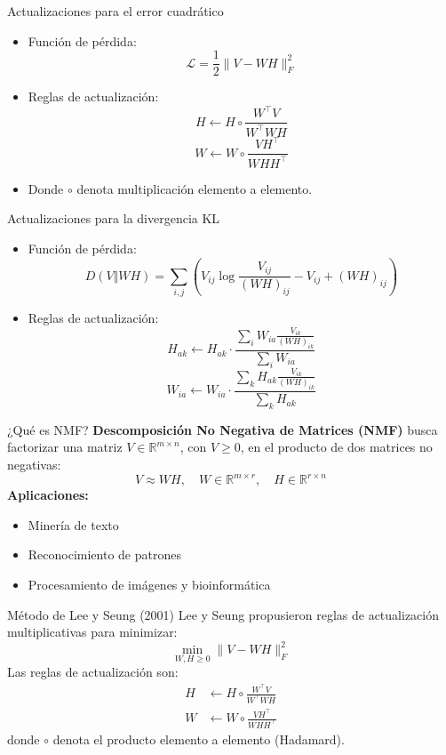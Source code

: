 \documentclass{beamer}
\begin{document}
\begin{frame}{Actualizaciones para el error cuadrático}
\begin{itemize}
    \item Función de pérdida:
    \[
    \mathcal{L} = \frac{1}{2} \| V - WH \|_F^2
    \]
    \item Reglas de actualización:
    \[
    H \leftarrow H \circ \frac{W^\top V}{W^\top W H}
    \]
    \[
    W \leftarrow W \circ \frac{V H^\top}{W H H^\top}
    \]
    \item Donde $ \circ $ denota multiplicación elemento a elemento.
\end{itemize}
\end{frame}

\begin{frame}{Actualizaciones para la divergencia KL}
\begin{itemize}
    \item Función de pérdida:
    \[
    D(V \Vert WH) = \sum_{i,j} \left( V_{ij} \log \frac{V_{ij}}{(WH)_{ij}} - V_{ij} + (WH)_{ij} \right)
    \]
    \item Reglas de actualización:
    \[
    H_{ak} \leftarrow H_{ak} \cdot \frac{\sum_i W_{ia} \frac{V_{ik}}{(WH)_{ik}}}{\sum_i W_{ia}}
    \]
    \[
    W_{ia} \leftarrow W_{ia} \cdot \frac{\sum_k H_{ak} \frac{V_{ik}}{(WH)_{ik}}}{\sum_k H_{ak}}
    \]
\end{itemize}
\end{frame}


\begin{frame}{¿Qué es NMF?}
    \textbf{Descomposición No Negativa de Matrices (NMF)} busca factorizar una matriz $ V \in \mathbb{R}^{m \times n} $, con $ V \geq 0 $, en el producto de dos matrices no negativas:
    \[
        V \approx WH, \quad W \in \mathbb{R}^{m \times r}, \quad H \in \mathbb{R}^{r \times n}
    \]
    \pause
    \textbf{Aplicaciones:}
    \begin{itemize}
        \item Minería de texto
        \item Reconocimiento de patrones
        \item Procesamiento de imágenes y bioinformática
    \end{itemize}
\end{frame}

\begin{frame}{Método de Lee y Seung (2001)}
    Lee y Seung propusieron reglas de actualización multiplicativas para minimizar:
    \[
        \min_{W,H \geq 0} \| V - WH \|_F^2
    \]
    Las reglas de actualización son:
    \begin{align*}
        H &\leftarrow H \circ \frac{W^\top V}{W^\top WH} \\
        W &\leftarrow W \circ \frac{V H^\top}{WHH^\top}
    \end{align*}
    donde $ \circ $ denota el producto elemento a elemento (Hadamard).
\end{frame}
\end{document}
